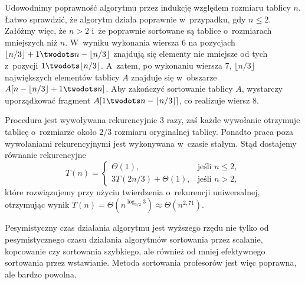 
\subproblem %
Udowodnimy poprawność algorytmu przez indukcję względem rozmiaru tablicy $n$.
Łatwo sprawdzić, że algorytm działa poprawnie w~przypadku, gdy $n\le2$.
Załóżmy więc, że $n>2$ i~że poprawnie sortowane są tablice o~rozmiarach mniejszych niż $n$.
W~wyniku wykonania wiersza 6 na pozycjach $\lfloor n/3\rfloor+1\twodots n-\lfloor n/3\rfloor$ znajdują się elementy nie mniejsze od tych z~pozycji $1\twodots\lfloor n/3\rfloor$.
A~zatem, po wykonaniu wiersza 7, $\lfloor n/3\rfloor$ największych elementów tablicy $A$ znajduje się w~obszarze $A[n-\lfloor n/3\rfloor+1\twodots n]$.
Aby zakończyć sortowanie tablicy $A$, wystarczy uporządkować fragment $A[1\twodots n-\lfloor n/3\rfloor]$, co realizuje wiersz 8.

\subproblem %
Procedura jest wywoływana rekurencyjnie 3 razy, zaś każde wywołanie otrzymuje tablicę o~rozmiarze około $2/3$ rozmiaru oryginalnej tablicy.
Ponadto praca poza wywołaniami rekurencyjnymi jest wykonywana w~czasie stałym.
Stąd dostajemy równanie rekurencyjne
\[
	T(n) =
	\begin{cases}
		\Theta(1), & \text{jeśli $n\le2$}, \\
		3T(2n/3)+\Theta(1), & \text{jeśli $n>2$},
	\end{cases}
\]
które rozwiązujemy przy użyciu twierdzenia o~rekurencji uniwersalnej, otrzymując wynik $T(n)=\Theta(n^{\log_{3/2}3})\approx \Theta(n^{2{,}71})$.

\subproblem %
Pesymistyczny czas działania algorytmu  jest wyższego rzędu nie tylko od pesymistycznego czasu działania algorytmów sortowania przez scalanie, kopcowanie czy sortowania szybkiego, ale również od mniej efektywnego sortowania przez wstawianie.
Metoda sortowania profesorów jest więc poprawna, ale bardzo powolna.
